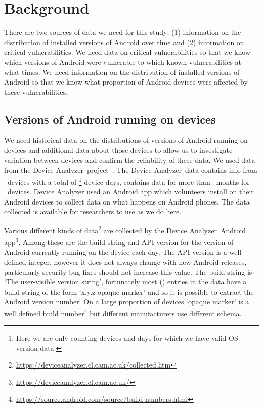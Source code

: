 \documentclass[conference,a4paper,twoside]{IEEEtran}
\newcommand{\da}{Device Analyzer}
\newcommand{\daNumDevices}{\daNumOSDevices}
\newcommand{\daDeviceDays}{\daOSTotalDaysData}
\begin{document}
\section{Background}
\label{sec:background}
There are two sources of data we need for this study: (1) information on the distribution of installed versions of Android over time and (2) information on critical vulnerabilities.
We need data on critical vulnerabilities so that we know which versions of Android were vulnerable to which known vulnerabilities at what times.
We need information on the distribution of installed versions of Android so that we know what proportion of Android devices were affected by these vulnerabilities.


\subsection{Versions of Android running on devices}
We need historical data on the distributions of versions of Android running on devices and additional data about those devices to allow us to investigate variation between devices and confirm the reliability of these data.
We used data from the \da\ project~\cite{Wagner2013}.
The \da\ data contains info from \daNumDevices\ devices with a total of \daDeviceDays\footnote{Here we are only counting devices and days for which we have valid OS version data.} device days, contains data for more than \daMonths\ months for \daMonthsDevices\ devices.
Device Analyzer used an Android app which volunteers install on their Android devices to collect data on what happens on Android phones.
The data collected is available for researchers to use as we do here.

Various different kinds of data\footnote{\url{https://deviceanalyzer.cl.cam.ac.uk/collected.htm}} are collected by the \da\ Android app\footnote{\url{https://deviceanalyzer.cl.cam.ac.uk/}}.
Among these are the build string and API version for the version of Android currently running on the device each day.
The API version is a well defined integer, however it does not always change with new Android releases, particularly security bug fixes should not increase this value.
The build string is `The user-visible version string', fortunately most (\daOSVersionPercValidLines) entries in the data have a build string of the form `x.y.z opaque marker' and so it is possible to extract the Android version number.
On a large proportion of devices `opaque marker' is a well defined build number\footnote{\url{https://source.android.com/source/build-numbers.html}} but different manufacturers use different schema.
\end{document}
